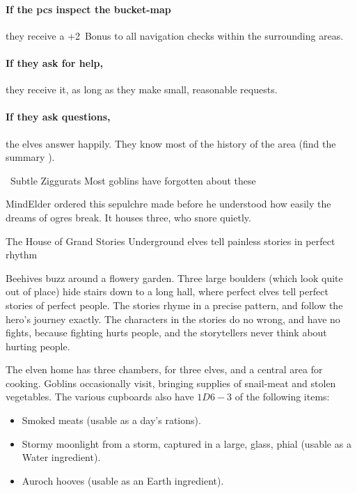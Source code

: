 \begin{multicols}{2}
\paragraph{If the \glspl{pc} inspect the bucket-map}
they receive a +2~Bonus to all \gls{navigation} checks within the surrounding \glspl{area}.

\paragraph{If they ask for help,}
they receive it, as long as they make small, reasonable requests.

\paragraph{If they ask questions,}
the elves answer happily.
They know most of the history of the area (find the summary ).

{\squash~Subtle Ziggurats}%
{Most goblins have forgotten about these }%

\Gls{MindElder} ordered this sepulchre made before he understood how easily the dreams of \glspl{ogre} break.
It houses three, who snore quietly.

{The House of Grand Stories}%
{Underground elves tell painless stories in perfect rhythm}%

Beehives buzz around a flowery garden.
Three large boulders (which look quite out of place) hide stairs down to a long hall, where perfect elves tell perfect stories of perfect people.
The stories rhyme in a precise pattern, and follow the hero's journey exactly.
The characters in the stories do no wrong, and have no fights, because fighting hurts people, and the storytellers never think about hurting people.

The elven home has three chambers, for three elves, and a central area for cooking.
Goblins occasionally visit, bringing supplies of snail-meat and stolen vegetables.
The various cupboards also have $1D6-3$ of the following items:

\begin{itemize}
  \item
  Smoked meats (usable as a day's \glspl{ration}).
  \item
  Stormy moonlight from a storm, captured in a large, glass, phial (usable as a Water \gls{ingredient}).
  \item
  Auroch hooves (usable as an Earth \gls{ingredient}).
\end{itemize}

\elf

\end{multicols}

\stopcontents[sq]
